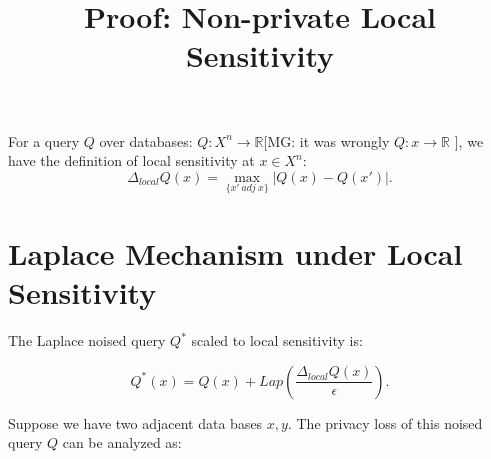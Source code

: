 \documentclass{article}
\title{\textbf{Proof: Non-private Local Sensitivity}\\
}
\newcommand{\mg}[1]{\textcolor[rgb]{.90,0.00,0.00}{[MG: #1]}}
\begin{document}
\maketitle %




For a query $Q$ over databases: $Q: X^n \rightarrow \mathbb{R}$\mg{it
was wrongly $Q: x \rightarrow \mathbb{R}$ }, we
have the definition of local sensitivity at $x\in X^n$:
\begin{equation*}
\Delta_{local} Q(x) = \max_{\{x'\ adj\ x\}}| Q(x)- Q(x')|.
\end{equation*}

\section{Laplace Mechanism under Local Sensitivity}

The Laplace noised query $Q^{*}$ scaled to local sensitivity is:

\begin{equation*}
Q^{*}(x) = Q(x) + Lap(\frac{\Delta_{local} Q(x)}{\epsilon}).
\end{equation*}

Suppose we have two adjacent data bases $x,y$. The privacy loss of this noised query $Q$ can be analyzed as:
\end{document}
